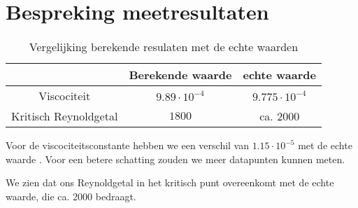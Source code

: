 \section{Bespreking meetresultaten}

\begin{table}[H]
    \centering
    \label{tab:vergelijking}
    \caption{Vergelijking berekende resulaten met de echte waarden}
    \begin{tabular}{| c | c | c |}
        \hline
                                & Berekende waarde      & echte waarde          \\ \hline
        Viscociteit             & $9.89 \cdot 10^{-4}$  & $9.775 \cdot 10^{-4}$ \\ \hline
        Kritisch Reynoldgetal   & $1800$                & ca. $2000$            \\ \hline
    \end{tabular}
\end{table}
Voor de viscociteitsconstante hebben we een verschil van $1.15 \cdot 10^{-5}$ met de echte waarde \cite{viscocity}.
Voor een betere schatting zouden we meer datapunten kunnen meten.

We zien dat ons Reynoldgetal in het kritisch punt overeenkomt met de echte waarde, die ca. 2000 bedraagt.